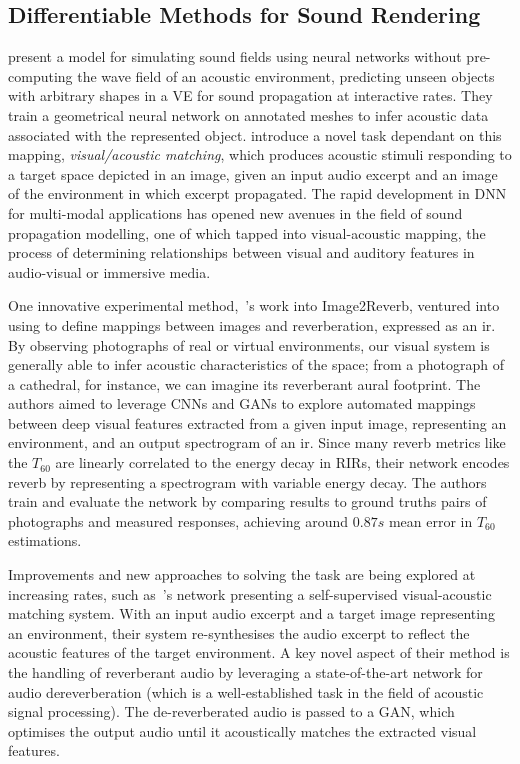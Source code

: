 \subsection{Differentiable Methods for Sound Rendering}
\cite{manocha2020differentiable} present a model for simulating sound fields using neural networks without pre-computing the wave field of an acoustic environment, predicting unseen objects with arbitrary shapes in a VE for sound propagation at interactive rates. They train a geometrical neural network on annotated meshes to infer acoustic data associated with the represented object.
\cite{chen2022visual} introduce a novel task dependant on this mapping, \textit{visual/acoustic matching}, which produces acoustic stimuli responding to a target space depicted in an image, given an input audio excerpt and an image of the environment in which excerpt propagated. The rapid development in DNN for multi-modal applications has opened new avenues in the field of sound propagation modelling, one of which tapped into visual-acoustic mapping, the process of determining relationships between visual and auditory features in audio-visual or immersive media.\par
One innovative experimental method,~\cite{Singh_2021_ICCV}'s work into Image2Reverb, ventured into using  to define mappings between images and reverberation, expressed as an \acrshort{ir}. By observing photographs of real or virtual environments, our visual system is generally able to infer acoustic characteristics of the space; from a photograph of a cathedral, for instance, we can imagine its reverberant aural footprint. The authors aimed to leverage CNNs and GANs to explore automated mappings between deep visual features extracted from a given input image, representing an environment, and an output spectrogram of an \acrshort{ir}. Since many reverb metrics like the $T_{60}$ are linearly correlated to the energy decay in RIRs, their network encodes reverb by representing a spectrogram with variable energy decay. The authors train and evaluate the network by comparing results to ground truths pairs of photographs and measured responses, achieving around $0.87s$ mean error in $T_{60}$ estimations.\par
Improvements and new approaches to solving the task are being explored at increasing rates, such as~\cite{somayazulu2023self}'s network presenting a self-supervised visual-acoustic matching system. With an input audio excerpt and a target image representing an environment, their system re-synthesises the audio excerpt to reflect the acoustic features of the target environment. A key novel aspect of their method is the handling of reverberant audio by leveraging a state-of-the-art network for audio dereverberation (which is a well-established task in the field of acoustic signal processing). The de-reverberated audio is passed to a GAN, which optimises the output audio until it acoustically matches the extracted visual features.\par

